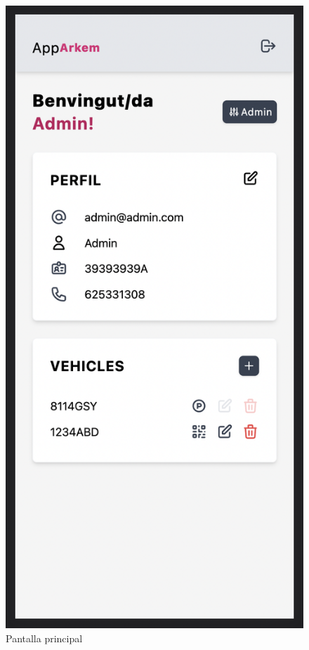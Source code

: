 \begin{figure}[H]
    \begin{center}
        \includegraphics[scale=0.50]{Fotos/pantalla2_index.png}
    \end{center}
    \caption{Pantalla principal}
    \label{fig:index_photo}
\end{figure}

